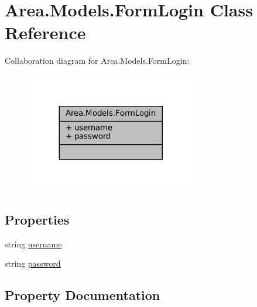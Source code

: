 \hypertarget{classArea_1_1Models_1_1FormLogin}{}\section{Area.\+Models.\+Form\+Login Class Reference}
\label{classArea_1_1Models_1_1FormLogin}


Collaboration diagram for Area.\+Models.\+Form\+Login\+:
\nopagebreak
\begin{figure}[H]
\begin{center}
\leavevmode
\includegraphics[width=212pt]{classArea_1_1Models_1_1FormLogin__coll__graph}
\end{center}
\end{figure}
\subsection*{Properties}
\begin{DoxyCompactItemize}
\item 
string \mbox{\hyperlink{classArea_1_1Models_1_1FormLogin_a4702f49df99650fe317cf8e02b721921}{username}}
\item 
string \mbox{\hyperlink{classArea_1_1Models_1_1FormLogin_ab398fa2efd055aed5845781c47848821}{password}}
\end{DoxyCompactItemize}


\subsection{Property Documentation}
\mbox{\label{classArea_1_1Models_1_1FormLogin_ab398fa2efd055aed5845781c47848821}} 
